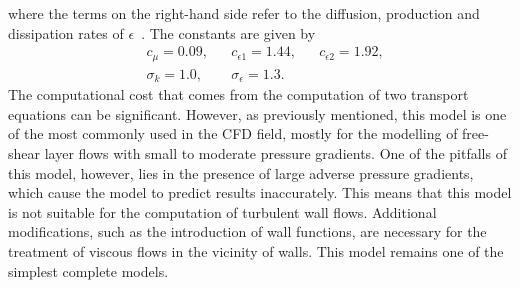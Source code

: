 where the terms on the right-hand side refer to the diffusion, production and dissipation rates of $\epsilon$~\cite{andersonComputationalFluidMechanics2016}.
The constants are given by
\begin{align}
    & c_\mu = 0.09,   & & c_{\epsilon 1} = 1.44, & & c_{\epsilon 2} = 1.92, \\
    & \sigma_k = 1.0, & & \sigma_\epsilon = 1.3.  
\end{align}
The computational cost that comes from the computation of two transport equations can be significant. However, as previously mentioned, this model is one of the most commonly used in the CFD field, mostly for the modelling of free-shear layer flows with small to moderate pressure gradients. One of the pitfalls of this model, however, lies in the presence of large adverse pressure gradients, which cause the model to predict results inaccurately. This means that this model is not suitable for the computation of turbulent wall flows. Additional modifications, such as the introduction of wall functions, are necessary for the treatment of viscous flows in the vicinity of walls. This model remains one of the simplest complete models.

